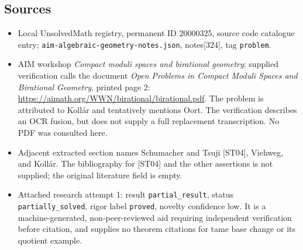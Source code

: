\documentclass[11pt]{article}
\begin{document}
\subsection{Sources}
\begin{itemize}
\item Local UnsolvedMath registry, permanent ID 20000325, source code catalogue entry; \texttt{aim-algebraic-geometry-notes.json}, notes[324], tag \texttt{problem}.
\item AIM workshop \emph{Compact moduli spaces and birational geometry}; supplied verification calls the document \emph{Open Problems in Compact Moduli Spaces and Birational Geometry}, printed page 2: \url{https://aimath.org/WWN/birational/birational.pdf}. The problem is attributed to Kollár and tentatively mentions Oort. The verification describes an OCR fusion, but does not supply a full replacement transcription. No PDF was consulted here.
\item Adjacent extracted section names Schumacher and Tsuji [ST04], Viehweg, and Kollár. The bibliography for [ST04] and the other assertions is not supplied; the original literature field is empty.
\item Attached research attempt 1: result \texttt{partial\_result}, status \texttt{partially\_solved}, rigor label \texttt{proved}, novelty confidence low. It is a machine-generated, non-peer-reviewed aid requiring independent verification before citation, and supplies no theorem citations for tame base change or its quotient example.
\end{itemize}
\end{document}
